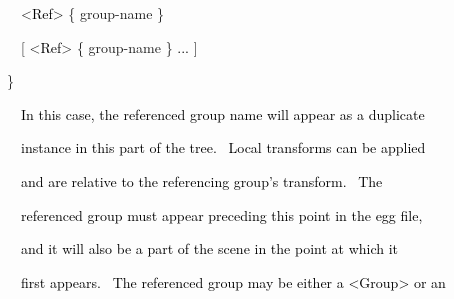 \documentclass[a4paper]{article}
\newcommand\textstyleOOoComputerKeyWord[1]{\textrm{\textcolor[rgb]{0.0,0.0,0.5019608}{#1}}}
\newcommand\textstyleOOoAssemblerSpecialChar[1]{\textrm{\textcolor[rgb]{0.0,0.5019608,0.0}{#1}}}
\newcommand\textstyleOOoAssemblerIdent[1]{\textrm{\textcolor{black}{#1}}}
\newcommand\textstyleOOoAssemblerDirective[1]{\textrm{\textcolor[rgb]{0.0,0.5019608,1.0}{#1}}}
\begin{document}
{\color{black}
\textstyleOOoComputerKeyWord{\textcolor{black}{\ \ }}\textstyleOOoAssemblerSpecialChar{{\textless}}\textstyleOOoAssemblerIdent{Ref}\textstyleOOoAssemblerSpecialChar{{\textgreater}}\textstyleOOoComputerKeyWord{\textcolor{black}{
}}\textstyleOOoAssemblerSpecialChar{\{}\textstyleOOoComputerKeyWord{\textcolor{black}{
}}\textstyleOOoAssemblerDirective{group}\textstyleOOoAssemblerSpecialChar{{}-}\textstyleOOoAssemblerDirective{name}\textstyleOOoComputerKeyWord{\textcolor{black}{
}}\textstyleOOoAssemblerSpecialChar{\}}\textstyleOOoComputerKeyWord{\textcolor{black}{ }}}

{\color{black}
\textstyleOOoComputerKeyWord{\textcolor{black}{\ \ }}\textstyleOOoAssemblerSpecialChar{[}\textstyleOOoComputerKeyWord{\textcolor{black}{
}}\textstyleOOoAssemblerSpecialChar{{\textless}}\textstyleOOoAssemblerIdent{Ref}\textstyleOOoAssemblerSpecialChar{{\textgreater}}\textstyleOOoComputerKeyWord{\textcolor{black}{
}}\textstyleOOoAssemblerSpecialChar{\{}\textstyleOOoComputerKeyWord{\textcolor{black}{
}}\textstyleOOoAssemblerDirective{group}\textstyleOOoAssemblerSpecialChar{{}-}\textstyleOOoAssemblerDirective{name}\textstyleOOoComputerKeyWord{\textcolor{black}{
}}\textstyleOOoAssemblerSpecialChar{\}}\textstyleOOoComputerKeyWord{\textcolor{black}{
}}\textstyleOOoAssemblerIdent{...}\textstyleOOoComputerKeyWord{\textcolor{black}{
}}\textstyleOOoAssemblerSpecialChar{]}}

{\color{black}
\textstyleOOoAssemblerSpecialChar{\}}}


\bigskip

{\color{black}
\textstyleOOoComputerKeyWord{\textcolor{black}{\ \ In this case, the referenced group name will appear as a duplicate}}}

{\color{black}
\textstyleOOoComputerKeyWord{\textcolor{black}{\ \ instance in this part of the tree. \ Local transforms can be
applied}}}

{\color{black}
\textstyleOOoComputerKeyWord{\textcolor{black}{\ \ and are relative to the referencing group's transform. \ The}}}

{\color{black}
\textstyleOOoComputerKeyWord{\textcolor{black}{\ \ referenced group must appear preceding this point in the egg file,}}}

{\color{black}
\textstyleOOoComputerKeyWord{\textcolor{black}{\ \ and it will also be a part of the scene in the point at which it}}}

{\color{black}
\textstyleOOoComputerKeyWord{\textcolor{black}{\ \ first appears. \ The referenced group may be either a
{\textless}Group{\textgreater} or an}}}
\end{document}
